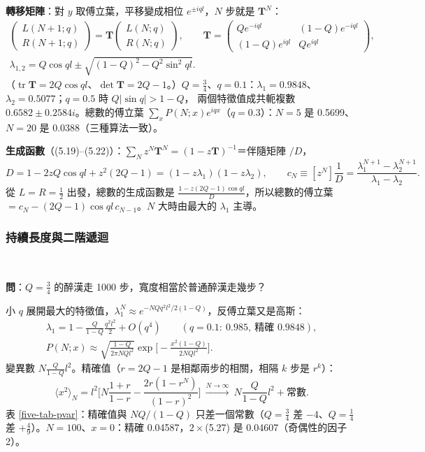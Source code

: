 \textbf{轉移矩陣}：對 $y$ 取傅立葉，平移變成相位 $e^{\pm iql}$，$N$ 步就是 $\mathbf T^N$：
\begin{gather*}
\begin{pmatrix}L(N+1;q)\\R(N+1;q)\end{pmatrix}=\mathbf T\begin{pmatrix}L(N;q)\\R(N;q)\end{pmatrix},\qquad
\mathbf T=\begin{pmatrix}Qe^{-iql}&(1-Q)e^{-iql}\\(1-Q)e^{iql}&Qe^{iql}\end{pmatrix},\tag{5.15}\\
\lambda_{1,2}=Q\cos ql\pm\sqrt{(1-Q)^2-Q^2\sin^2ql}.\tag{5.17, 5.18}
\end{gather*}
（$\operatorname{tr}\mathbf T=2Q\cos ql$、$\det\mathbf T=2Q-1$。）$Q=\frac34$、$q=0.1$：$\lambda_1=0.9848$、$\lambda_2=0.5077$；$q=0.5$ 時 $Q|\sin q|>1-Q$，
兩個特徵值成共軛複數 $0.6582\pm0.2584i$。總數的傅立葉 $\sum_xP(N;x)e^{iqx}$（$q=0.3$）：$N=5$ 是 0.5699、$N=20$ 是 0.0388（三種算法一致）。

\textbf{生成函數}（(5.19)--(5.22)）：$\sum_Nz^N\mathbf T^N=(1-z\mathbf T)^{-1}$＝伴隨矩陣 $/D$，
\[D=1-2zQ\cos ql+z^2(2Q-1)=(1-z\lambda_1)(1-z\lambda_2),\qquad c_N\equiv[z^N]\frac1D=\frac{\lambda_1^{N+1}-\lambda_2^{N+1}}{\lambda_1-\lambda_2}.\tag{5.22, 5.25}\]
從 $L=R=\frac12$ 出發，總數的生成函數是 $\frac{1-z(2Q-1)\cos ql}{D}$，所以總數的傅立葉 $=c_N-(2Q-1)\cos ql\,c_{N-1}$。$N$ 大時由最大的 $\lambda_1$ 主導。

\subsubsection{持續長度與二階遞迴}
\leavevmode{}\ \par\nopagebreak

\textbf{問}：$Q=\frac34$ 的醉漢走 1000 步，寬度相當於普通醉漢走幾步？

小 $q$ 展開最大的特徵值，$\lambda_1^N\approx e^{-NQq^2l^2/2(1-Q)}$，反傅立葉又是高斯：
\begin{gather*}
\lambda_1=1-\frac{Q}{1-Q}\frac{q^2l^2}{2}+O(q^4)\qquad(q=0.1{:}\ 0.985,\ \text{精確 }0.9848),\tag{5.23}\\
P(N;x)\approx\sqrt{\frac{1-Q}{2\pi NQl^2}}\exp\Big[-\frac{x^2(1-Q)}{2NQl^2}\Big].\tag{5.27}
\end{gather*}
變異數 $N\frac{Q}{1-Q}l^2$。精確值（$r=2Q-1$ 是相鄰兩步的相關，相隔 $k$ 步是 $r^k$）：
\[\langle x^2\rangle_N=l^2\Big[N\frac{1+r}{1-r}-\frac{2r(1-r^N)}{(1-r)^2}\Big]\ \xrightarrow{N\to\infty}\ N\frac{Q}{1-Q}l^2+\text{常數}.\]
表 \ref{five-tab-pvar}：精確值與 $NQ/(1-Q)$ 只差一個常數（$Q=\frac34$ 差 $-4$、$Q=\frac14$ 差 $+\frac49$）。$N=100$、$x=0$：精確 0.04587，$2\times$(5.27) 是 0.04607（奇偶性的因子 2）。

